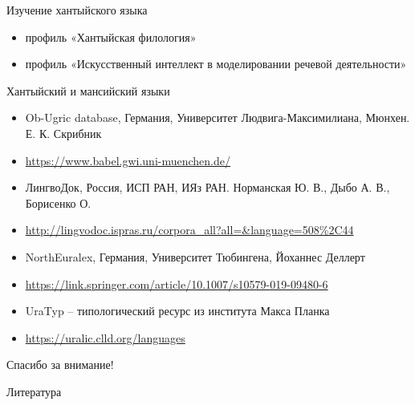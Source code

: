 \documentclass[
  ignorenonframetext,
]{beamer}
\newif\ifbibliography
\providecommand{\tightlist}{%
  \setlength{\itemsep}{0pt}\setlength{\parskip}{0pt}}
\begin{document}
\begin{frame}{Изучение хантыйского языка}
\protect\hypertarget{ux438ux437ux443ux447ux435ux43dux438ux435-ux445ux430ux43dux442ux44bux439ux441ux43aux43eux433ux43e-ux44fux437ux44bux43aux430}{}
\begin{itemize}
\tightlist
\item
  профиль «Хантыйская филология»
\item
  профиль «Искусственный интеллект в моделировании речевой деятельности»
\end{itemize}
\end{frame}

\begin{frame}{Хантыйский и мансийский языки}
\protect\hypertarget{ux445ux430ux43dux442ux44bux439ux441ux43aux438ux439-ux438-ux43cux430ux43dux441ux438ux439ux441ux43aux438ux439-ux44fux437ux44bux43aux438}{}
\begin{itemize}
\tightlist
\item
  Ob-Ugric database, Германия, Университет Людвига-Максимилиана, Мюнхен.
  Е. К. Скрибник
\item
  \url{https://www.babel.gwi.uni-muenchen.de/} \pause
\item
  ЛингвоДок, Россия, ИСП РАН, ИЯз РАН. Норманская Ю. В., Дыбо А. В.,
  Борисенко О.
\item
  \url{http://lingvodoc.ispras.ru/corpora_all?all=\&language=508\%2C44}
  \pause
\item
  NorthEuralex, Германия, Университет Тюбингена, Йоханнес Деллерт
\item
  \url{https://link.springer.com/article/10.1007/s10579-019-09480-6}
  \pause
\item
  UraTyp -- типологический ресурс из института Макса Планка
\item
  \url{https://uralic.clld.org/languages}
\end{itemize}
\end{frame}

\begin{frame}{}
\protect\hypertarget{section}{}
\LARGE Спасибо за внимание!
\end{frame}

\renewcommand\refname{Литература}
\begin{frame}[allowframebreaks]{Литература}
  \bibliographytrue
  
\end{frame}
\end{document}
